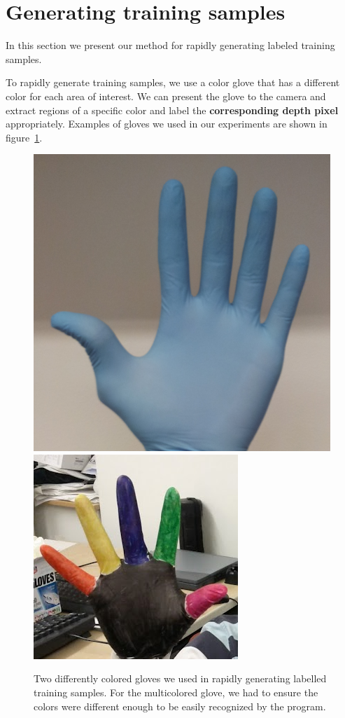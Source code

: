 \section{Generating training samples}
\label{sec: generating_training}

In this section we present our method for rapidly generating labeled training samples.

To rapidly generate training samples, we use a color glove that has a different color for each area of interest. We can present the glove to the camera and extract regions of a specific color and label the \textbf{corresponding depth pixel} appropriately.  Examples of gloves we used in our experiments are shown in figure~\ref{fig:gloves}.

\begin{figure}
\begin{center}
\includegraphics[width=0.23 \textwidth]{fig/blueglove.png}
\includegraphics[width=0.23 \textwidth]{fig/colorglove.png}
\end{center}
\caption{Two differently colored gloves we used in rapidly generating labelled training samples. For the multicolored glove, we had to ensure the colors were different enough to be easily recognized by the program.}
\label{fig:gloves}
\end{figure}

